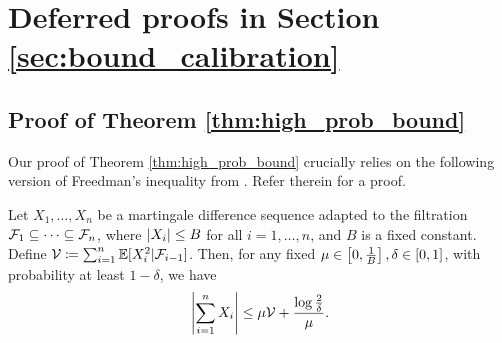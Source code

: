 \section{Deferred proofs in Section \ref{sec:bound_calibration}}\label{app:hp_bound}
\subsection{Proof of Theorem \ref{thm:high_prob_bound}}
Our proof of Theorem \ref{thm:high_prob_bound} crucially relies on the following version of Freedman's inequality from \cite{beygelzimer2011contextual}. Refer therein for a proof. 
\begin{lemma}\label{lem:Freedman} Let $X_{1}, \dots, X_{n}$ be a martingale difference sequence adapted to the filtration $\mathcal{F}_{1} \subseteq \dots \subseteq \mathcal{F}_{n}$, where $\left\lvert X_{i}\right\rvert \le B$ for all $i = 1, \dots, n$, and $B$ is a fixed constant. Define $\mathcal{V} \coloneqq \sum_{i = 1} ^ {n} \mathbb{E}[X_{i}^2 | \mathcal{F}_{i - 1}]$. Then, for any fixed $\mu \in \left[ 0, \frac{1}{B} \right], \delta \in [0, 1]$, with probability at least $1 - \delta$, we have \begin{align*}
    \left\lvert\sum_{i = 1} ^ {n} X_{i}\right\rvert \le \mu \mathcal{V} + \frac{\log \frac{2}{\delta}}{\mu}.
\end{align*}
\end{lemma}

